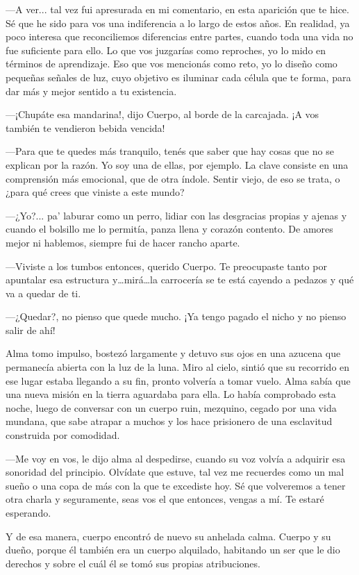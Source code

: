 \documentclass[11pt,twoside,openright,a5paper]{book}
\begin{document}
---A ver... tal vez fui apresurada en mi comentario, en esta aparición que te hice. Sé que he sido para vos una indiferencia a lo largo de estos años. En realidad, ya poco interesa que reconciliemos diferencias entre partes, cuando toda una vida no fue suficiente para ello. Lo que vos juzgarías como  reproches, yo lo mido en términos de aprendizaje. Eso que vos mencionás como reto, yo lo diseño como pequeñas señales de luz, cuyo objetivo es iluminar cada célula que te forma, para dar  más y mejor sentido a tu existencia.

---¡Chupáte esa mandarina!, dijo Cuerpo, al borde de la carcajada. ¡A vos también te vendieron bebida vencida!

---Para que te quedes más tranquilo, tenés que saber que hay cosas que no se explican por la razón. Yo soy una de ellas, por ejemplo. La clave consiste en una comprensión más emocional, que de otra índole. Sentir viejo, de eso se trata, o ¿para qué crees que viniste a este mundo? 

---¿Yo?... pa’ laburar como un perro, lidiar con las desgracias propias y ajenas y  cuando el bolsillo me lo permitía, panza llena y corazón contento. De amores mejor ni hablemos, siempre fui de hacer rancho aparte.

---Viviste a los tumbos entonces, querido Cuerpo. Te preocupaste tanto por apuntalar esa estructura y…mirá…la carrocería se te está cayendo a pedazos y qué va a quedar de ti.

---¿Quedar?, no pienso que quede mucho. ¡Ya tengo pagado el nicho y no pienso salir de ahí!

Alma tomo impulso, bostezó largamente y detuvo sus ojos en una azucena que permanecía abierta con la luz de la luna. Miro al cielo, sintió que su recorrido en ese lugar estaba llegando a su fin, pronto volvería a tomar vuelo. Alma sabía que una nueva misión en la tierra aguardaba para ella. Lo había comprobado esta noche, luego de conversar con un cuerpo ruin, mezquino, cegado por una vida mundana, que sabe atrapar a muchos y los hace prisionero de una esclavitud construida por comodidad.

---Me voy en vos, le dijo alma al despedirse, cuando su voz  volvía a adquirir esa sonoridad del principio. Olvídate que estuve, tal vez me recuerdes como un mal sueño o una copa de más con la que te excediste hoy. Sé que volveremos a tener otra charla y seguramente, seas vos el que entonces,  vengas a mí. Te estaré esperando.

Y de esa manera, cuerpo encontró de nuevo su anhelada calma. Cuerpo y su dueño, porque él también era un cuerpo alquilado, habitando un ser que le dio derechos y sobre el cuál él se tomó sus propias atribuciones.
\end{document}
